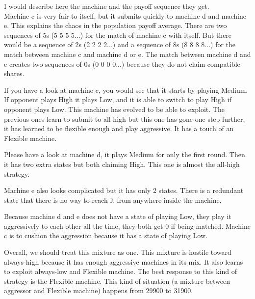 \documentclass[12.5pt]{report}
\begin{document}
I would describe here the machine and the payoff sequence they get. \\

Machine c is very fair to itself, but it submits quickly to machine d and machine e. This explains the chaos in the population payoff average. There are two sequences of 5s (5 5 5 5...) for the match of machine c with itself. But there would be a sequence of 2s (2 2 2 2...) and a sequence of 8s (8 8 8 8...) for the match between machine c and machine d or e. The match between machine d and e creates two sequences of 0s (0 0 0 0...) because they do not claim compatible shares.

If you have a look at machine c, you would see that it starts by playing Medium. If opponent plays High it plays Low, and it is able to switch to play High if opponent plays Low. This machine has evolved to be able to exploit. The previous ones learn to submit to all-high but this one has gone one step further, it has learned to be flexible enough and play aggressive. It has a touch of an Flexible machine.

Please have a look at machine d, it plays Medium for only the first round. Then it has two extra states but both claiming High. This one is almost the all-high strategy.

Machine e also looks complicated but it has only 2 states. There is a redundant state that there is no way to reach it from anywhere inside the machine.

Because machine d and e does not have a state of playing Low, they play it aggressively to each other all the time, they both get 0 if being matched. Machine c is to cushion the aggression because it has a state of playing Low.

Overall, we should treat this mixture as one. This mixture is hostile toward always-high because it has enough aggressive machines in its mix. It also learns to exploit always-low and Flexible machine. The best response to this kind of strategy is the Flexible machine. This kind of situation (a mixture between aggressor and Flexible machine) happens from 29900 to 31900.
\end{document}
